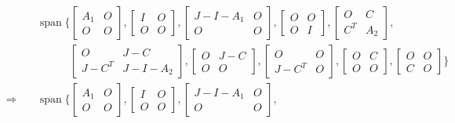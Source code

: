 \begin{align*}
    &\operatorname{span}\{
    \begin{bmatrix}
        A_1 & O\\
        O & O
    \end{bmatrix},
    \begin{bmatrix}
        I & O\\O & O
    \end{bmatrix},
    \begin{bmatrix}
        J-I-A_1 & O \\ O&O
    \end{bmatrix},
    \begin{bmatrix}
        O&O\\O&I
    \end{bmatrix},
    \begin{bmatrix}
        O&C\\C^T&A_2
    \end{bmatrix},\\
    &\quad\quad\quad\begin{bmatrix}
        O&J-C\\J-C^T&J-I-A_2
    \end{bmatrix},
    \begin{bmatrix}
        O&J-C\\O&O
    \end{bmatrix},
    \begin{bmatrix}
        O&O\\J-C^T&O
    \end{bmatrix},
    \begin{bmatrix}
        O&C\\O&O
    \end{bmatrix},
    \begin{bmatrix}
        O&O\\C&O
    \end{bmatrix}
    \}\\
    \Rightarrow\quad &\operatorname{span}\{
    \begin{bmatrix}
        A_1 & O\\
        O & O
    \end{bmatrix},
    \begin{bmatrix}
        I & O\\O & O
    \end{bmatrix},
    \begin{bmatrix}
        J-I-A_1 & O \\ O&O
    \end{bmatrix},

\end{align*}
